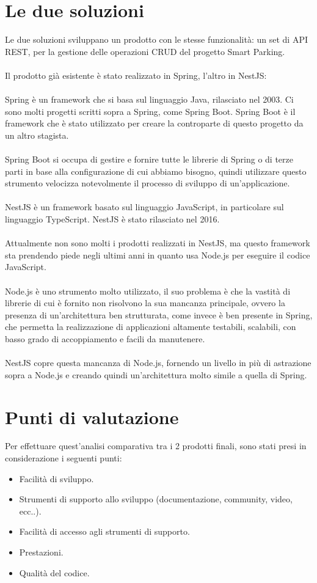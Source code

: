 \section{Le due soluzioni}
Le due soluzioni sviluppano un prodotto con le stesse funzionalità: un set di \gls{API} \gls{REST}, per la gestione delle operazioni \gls{CRUD} del
progetto Smart Parking.
\\\\
Il prodotto già esistente è stato realizzato in Spring, l'altro in NestJS:
\\\\
Spring è un framework che si basa sul linguaggio Java, rilasciato nel 2003. Ci sono molti progetti scritti
sopra a Spring, come Spring Boot. Spring Boot è il framework che è stato utilizzato per creare la controparte 
di questo progetto da un altro stagista.
\\\\
Spring Boot si occupa di gestire
e fornire tutte le librerie di Spring o di terze parti in base alla configurazione di cui abbiamo bisogno, quindi 
utilizzare questo strumento velocizza notevolmente il processo di sviluppo di un'applicazione.
\\\\
NestJS è un framework basato sul linguaggio JavaScript, in particolare sul linguaggio TypeScript. NestJS è
stato rilasciato nel 2016.
\\\\
Attualmente non sono molti i prodotti realizzati in NestJS, ma questo framework sta prendendo piede negli ultimi anni in quanto
usa Node.js per eseguire il codice JavaScript.
\\\\
Node.js è uno strumento molto utilizzato, il suo problema è che la vastità di librerie di cui è fornito non 
risolvono la sua mancanza principale, ovvero la presenza di un'architettura ben strutturata, come invece è ben presente in Spring, che 
permetta la realizzazione di applicazioni altamente testabili, scalabili, con basso grado di accoppiamento
e facili da manutenere.
\\\\
NestJS copre questa mancanza di Node.js, fornendo un livello in più di astrazione sopra a Node.js e creando quindi un'architettura 
molto simile a quella di Spring.

\section{Punti di valutazione}
Per effettuare quest'analisi comparativa tra i 2 prodotti finali, sono stati presi in considerazione i seguenti 
punti:
\begin{itemize}
    \item Facilità di sviluppo.
    \item Strumenti di supporto allo sviluppo (documentazione, community, video, ecc..).
    \item Facilità di accesso agli strumenti di supporto.
    \item Prestazioni.
    \item Qualità del codice.
\end{itemize}


